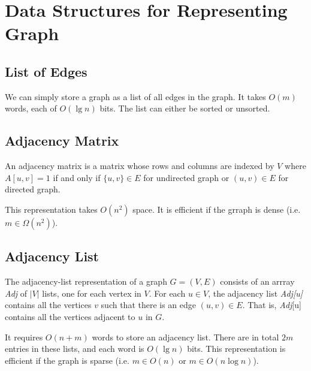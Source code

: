 \section{Data Structures for Representing Graph}

\subsection{List of Edges}

We can simply store a graph as a list of all edges in the graph. It takes $O(m)$ words, each of $O(\lg n)$ bits. The list can either be sorted or unsorted.

\subsection{Adjacency Matrix} 

\vspace{\parskip}

\begin{definition}
    An adjacency matrix is a matrix whose rows and columns are indexed by $V$ where $A[u,v]=1$ if and only if $\{u,v\} \in E$ for undirected graph or $(u,v) \in E$ for directed graph.
\end{definition}

This representation takes $O(n^2)$ space. It is efficient if the grraph is dense (i.e. $m \in \Omega(n^2)$).

\subsection{Adjacency List}

\vspace{\parskip}

\begin{definition} 
    The adjacency-list representation of a graph $G=(V,E)$ consists of an arrray \textit{Adj} of $|V|$ lists, one for each vertex in $V$. For each $u \in V$, the adjacency list \textit{Adj[u]} contains all the vertices $v$ such that there is an edge $(u,v) \in E$. That is, \textit{Adj}[u] contains all the vertices adjacent to $u$ in $G$.
\end{definition}

It requires $O(n+m)$ words to store an adjacency list. There are in total $2m$ entries in these lists, and each word is $O(\lg n)$ bits. This representation is efficient if the graph is sparse (i.e. $m \in O(n)$ or $m \in O(n \log n)$).

